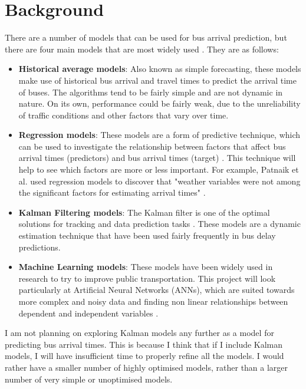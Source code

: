 \documentclass[12pt, a4paper]{article}
\begin{document}
\section{Background}

There are a number of models that can be used for bus arrival prediction, but there are four main models that are most widely used \cite{dynamic-gps}. They are as follows: 
\begin{itemize}
    \item \textbf{Historical average models}: Also known as simple forecasting, these models make use of historical bus arrival and travel times to predict the arrival time of buses. The algorithms tend to be fairly simple and are not dynamic in nature. On its own, performance could be fairly weak, due to the unreliability of traffic conditions and other factors that vary over time. 
    \item \textbf{Regression models}: These models are a form of predictive technique, which can be used to investigate the relationship between factors that affect bus arrival times (predictors) and bus arrival times (target) \cite{regression-techniques}. This technique will help to see which factors are more or less important. For example, Patnaik et al. used regression models to discover that "weather variables were not among the significant factors for estimating arrival times" \cite{apc-estimation}. 
    \item \textbf{Kalman Filtering models}: The Kalman filter is one of the optimal solutions for tracking and data prediction tasks \cite{kalman-mit}. These models are a dynamic estimation technique that have been used fairly frequently in bus delay predictions.
    \item \textbf{Machine Learning models}: These models have been widely used in research to try to improve public transportation. This project will look particularly at Artificial Neural Networks (ANNs), which are suited towards more complex and noisy data and finding non linear relationships between dependent and independent variables \cite{dynamic-gps}. 
\end{itemize}

I am not planning on exploring Kalman models any further as a model for predicting bus arrival times. This is because I think that if I include Kalman models, I will have insufficient time to properly refine all the models. I would rather have a smaller number of highly optimised models, rather than a larger number of very simple or unoptimised models.
\end{document}
